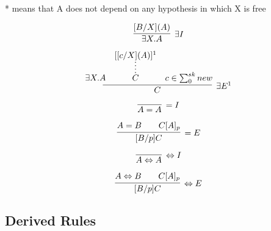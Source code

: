 * means that A does not depend on any hypothesis in which X is free

\begin{multicols}{2}
    \noindent
    \begin{minipage}{\linewidth}
        \vspace*{0.9cm}
        \[
            \infer[\exists I]{\exists X.A}{[B/X](A)}
        \]
    \end{minipage}

    \noindent
    \begin{minipage}{\linewidth}
        \[
            \infer[\exists E^1]{C}{
                \exists X.A \quad
                \infer*{C}{[[c/X](A)]^1} \quad
                c \in \sum_{0}^{sk} new \qquad
            } 
        \]
    \end{minipage}
\end{multicols}

\begin{multicols}{2}
    \noindent
    \begin{minipage}{\linewidth}
        \vspace{0.3cm}
        \[
            \infer[=I]{A=A}{}
        \]
    \end{minipage}

    \noindent
    \begin{minipage}{\linewidth}
        \[
            \infer[=E]{[B/p]C}{A=B \qquad C[A]_p}
        \]
    \end{minipage}
\end{multicols}

\begin{multicols}{2}
    \noindent
    \begin{minipage}{\linewidth}
        \vspace{0.3cm}
        \[
            \infer[\Leftrightarrow I]{A \Leftrightarrow A}{}
        \]
    \end{minipage}

    \noindent
    \begin{minipage}{\linewidth}
        \[
            \infer[\Leftrightarrow E]{[B/p]C}{A \Leftrightarrow B \qquad C[A]_p}
        \]
    \end{minipage}
\end{multicols}

\subsection{Derived Rules}

